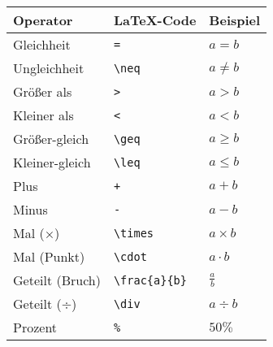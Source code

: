 \begin{table}[H]
    \centering
    \renewcommand{\arraystretch}{1.3}
    \begin{tabular}{lll}
        \toprule
        \textbf{Operator}       & \textbf{LaTeX-Code}                                                 & \textbf{Beispiel}          \\
        \midrule
        Gleichheit              & \texttt{=}                                                          & $ a = b $                  \\
        Ungleichheit            & \texttt{\textbackslash neq}                                         & $ a \neq b $               \\
        Größer als              & \texttt{>}                                                          & $ a > b $                  \\
        Kleiner als             & \texttt{<}                                                          & $ a < b $                  \\
        Größer-gleich           & \texttt{\textbackslash geq}                                         & $ a \geq b $               \\
        Kleiner-gleich          & \texttt{\textbackslash leq}                                         & $ a \leq b $               \\
        Plus                    & \texttt{+}                                                          & $ a + b $                  \\
        Minus                   & \texttt{-}                                                          & $ a - b $                  \\
        Mal (×)                 & \texttt{\textbackslash times}                                       & $ a \times b $             \\
        Mal (Punkt)             & \texttt{\textbackslash cdot}                                        & $ a \cdot b $              \\
        Geteilt (Bruch)         & \texttt{\textbackslash frac\{a\}\{b\}}                              & $ \frac{a}{b} $            \\
        Geteilt (÷)             & \texttt{\textbackslash div}                                         & $ a \div b $               \\
        Prozent                 & \texttt{\%}                                                         & $ 50\% $                   \\

\end{tabular}
\end{table}

